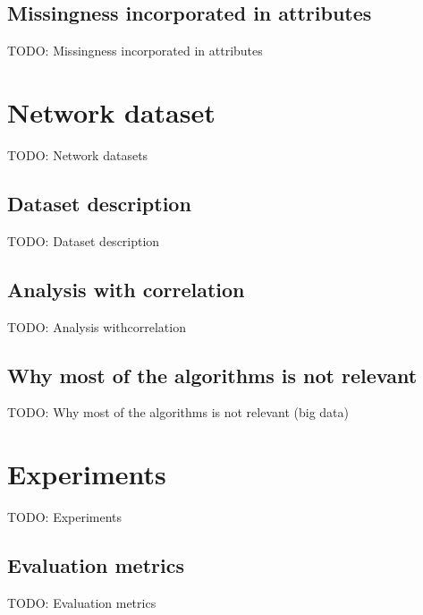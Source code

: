 \documentclass[11pt]{article}
\begin{document}
      \subsection{Missingness incorporated in attributes}
        TODO: Missingness incorporated in attributes
  \newpage
  \section{Network dataset}
    TODO: Network datasets
    \subsection{Dataset description}
      TODO: Dataset description
    \subsection{Analysis with correlation}
      TODO: Analysis withcorrelation
    \subsection{Why most of the algorithms is not relevant}
      TODO: Why most of the algorithms is not relevant (big data)
  \newpage
  \section{Experiments}
    TODO: Experiments
    \subsection{Evaluation metrics}
      TODO: Evaluation metrics
  \newpage
\end{document}

